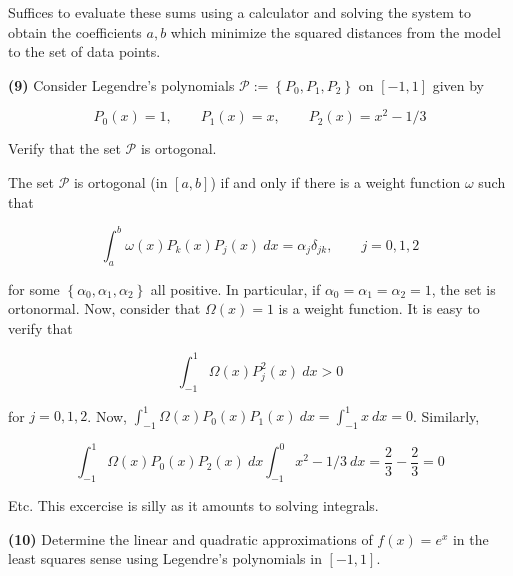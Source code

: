 \documentclass[12pt]{article}
\theoremstyle{definition}
\begin{document}
Suffices to evaluate these sums using a calculator and solving the system to 
obtain the coefficients $a, b$ which minimize the squared distances from 
the model to the set of data points.

\pagebreak 

\begin{shaded}
    \textbf{(9)} Consider Legendre's polynomials $\mathcal{P} :=
    \left\{ P_0, P_1, P_2 \right\} $ on $[-1, 1]$ given by 

    \begin{equation*}
        P_0(x) = 1, \qquad P_1(x) = x, \qquad P_2(x) = x^2 - 1 / 3
    \end{equation*}

    Verify that the set $\mathcal{P}$ is ortogonal.
\end{shaded}

The set $\mathcal{P}$ is ortogonal (in $[a, b]$) if and only if there is a weight function
$\omega$ such that 

\begin{equation*}
    \int_a^b \omega(x) P_k(x) P_j(x) ~ dx = \alpha_j \delta_{jk}, \qquad j = 0,
    1, 2
\end{equation*}

for some $\left\{ \alpha_0, \alpha_1, \alpha_2 \right\} $ all positive. In
particular, if $\alpha_0 = \alpha_1 = \alpha_2 = 1$, the set is ortonormal.
Now, consider that $\Omega(x) = 1$ is a weight function. It is easy to verify
that 

\begin{equation*}
    \int_{-1}^1 \Omega(x) P_j^2(x) ~ dx > 0
\end{equation*}

for $j = 0, 1, 2$. Now, $\int_{-1}^1 \Omega(x)P_0(x)P_1(x)~ dx = \int_{-1}^1 x ~
dx=
0$. Similarly, 

\begin{equation*}
    \int_{-1}^1 \Omega(x)P_0(x) P_2(x) ~ dx \int_{-1}^0 x^2 - 1 / 3 ~ dx =
    \frac{2}{3} - \frac{2}{3} = 0
\end{equation*}

Etc. This excercise is silly as it amounts to solving integrals.

\pagebreak 

\begin{shaded}
    \textbf{(10)} Determine the linear and quadratic approximations of $f(x) = e^x$ in the
    least squares sense using Legendre's polynomials in $[-1, 1]$.
\end{shaded}
\end{document}
